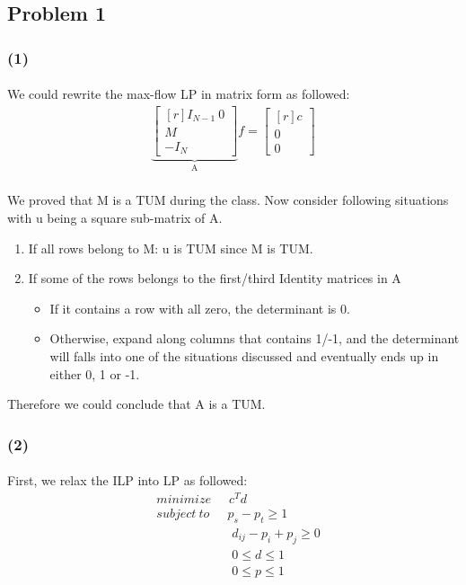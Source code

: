 \subsection*{Problem 1}
\subsubsection*{(1)}
\paragraph{}
We could rewrite the max-flow LP in matrix form as followed:
\begin{align*}
\underbrace{
\begin{bmatrix*}[r]
I_{N-1} \  0\\ 
M \ \ \\
-I_{N} \  
\end{bmatrix*}}_\text{A} f=
\begin{bmatrix*}[r]
c\\ 
0\\
0
\end{bmatrix*} 
\end{align*}
\paragraph{}
We proved that M is a TUM during the class. Now consider following situations with u being a square sub-matrix of A.
\begin{enumerate}
	\item If all rows belong to M: u is TUM since M is TUM.
	\item If some of the rows belongs to the first/third Identity matrices in A
	 \begin{itemize}
		\item If it contains a row with all zero, the determinant is 0.
		\item Otherwise, expand along columns that contains 1/-1, and the determinant will falls into one of the situations discussed and eventually ends up in either 0, 1 or -1.
	\end{itemize}
\end{enumerate}
Therefore we could conclude that A is a TUM.
\subsubsection*{(2)}
\paragraph{}
First, we relax the ILP into LP as followed:
\begin{align*}
& minimize \quad \ \ c^T d\\
& subject \ to \quad\ \ p_s - p_t \geq 1\\
&\qquad \qquad \qquad d_{ij} - p_i + p_j \geq 0\\
&\qquad \qquad \qquad 0\leq d\leq 1\\
&\qquad \qquad \qquad 0\leq p\leq 1\\
\end{align*}
